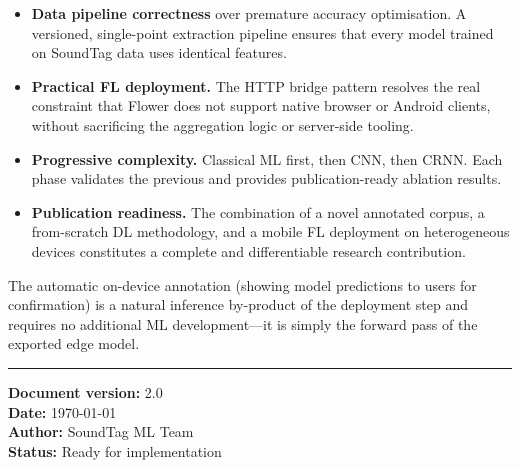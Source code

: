 \documentclass[11pt,a4paper]{article}
\begin{document}
\begin{itemize}[leftmargin=*,noitemsep]
  \item \textbf{Data pipeline correctness} over premature accuracy optimisation.
        A versioned, single-point extraction pipeline ensures that every model
        trained on SoundTag data uses identical features.
  \item \textbf{Practical FL deployment.} The HTTP bridge pattern resolves the
        real constraint that Flower does not support native browser or Android
        clients, without sacrificing the aggregation logic or server-side tooling.
  \item \textbf{Progressive complexity.} Classical ML first, then CNN, then CRNN.
        Each phase validates the previous and provides publication-ready ablation
        results.
  \item \textbf{Publication readiness.} The combination of a novel annotated
        corpus, a from-scratch DL methodology, and a mobile FL deployment on
        heterogeneous devices constitutes a complete and differentiable research
        contribution.
\end{itemize}

The automatic on-device annotation (showing model predictions to users for
confirmation) is a natural inference by-product of the deployment step and
requires no additional ML development---it is simply the forward pass of the
exported edge model.

\vspace{1cm}
\noindent\rule{\textwidth}{0.5pt}
\noindent\textbf{Document version:} 2.0 \\
\noindent\textbf{Date:} \today \\
\noindent\textbf{Author:} SoundTag ML Team \\
\noindent\textbf{Status:} Ready for implementation
\end{document}
